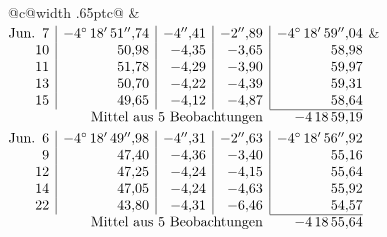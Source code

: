 \noindent\begin{tabular}{@{}c@{\hspace{.4em}\vrule width .65pt\hspace{.4em}}c@{}}
 &
 \\[.18ex]
\(\begin{array}[t]{@{}r|r|r|r|r@{}}
\text{Jun.}\enspace 7 & -4^\circ\,18'\,51''{,}74 & -4''{,}41 & -2''{,}89 & -4^\circ\,18'\,59''{,}04\\
10 & 50{,}98 & -4{,}35 & -3{,}65 & 58{,}98\\
11 & 51{,}78 & -4{,}29 & -3{,}90 & 59{,}97\\
13 & 50{,}70 & -4{,}22 & -4{,}39 & 59{,}31\\
15 & 49{,}65 & -4{,}12 & -4{,}87 & 58{,}64\\
\cline{5-5}
\multicolumn{4}{r}{\text{Mittel aus 5 Beobachtungen}} & -4\,18\,59{,}19
\end{array}\)
&
\(\begin{array}[t]{@{}r|r|r|r|r@{}}
\text{Jun.}\enspace 6 & -4^\circ\,18'\,49''{,}98 & -4''{,}31 & -2''{,}63 & -4^\circ\,18'\,56''{,}92\\
9 & 47{,}40 & -4{,}36 & -3{,}40 & 55{,}16\\
12 & 47{,}25 & -4{,}24 & -4{,}15 & 55{,}64\\
14 & 47{,}05 & -4{,}24 & -4{,}63 & 55{,}92\\
22 & 43{,}80 & -4{,}31 & -6{,}46 & 54{,}57\\
\cline{5-5}
\multicolumn{4}{r}{\text{Mittel aus 5 Beobachtungen}} & -4\,18\,55{,}64
\end{array}\)
\end{tabular}\par\medskip
{}

